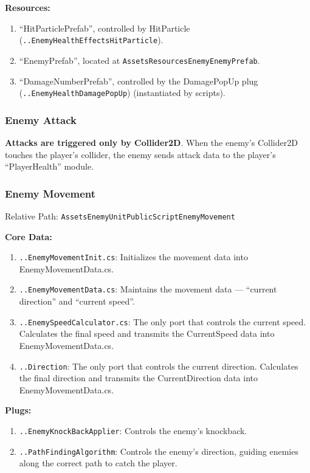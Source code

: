 \par\textbf{Resources:}
\begin{enumerate}
	\item ``HitParticlePrefab'', controlled by HitParticle (\texttt{\bs ..\bs EnemyHealth\bs Effects\bs HitParticle}).
	\item ``EnemyPrefab'', located at \texttt{\bs Assets\bs Resources\bs Enemy\bs EnemyPrefab}.
	\item ``DamageNumberPrefab'', controlled by the DamagePopUp plug (\texttt{\bs ..\bs EnemyHealth\bs DamagePopUp}) (instantiated by scripts).
\end{enumerate}

\subsubsection{Enemy Attack}

\par \hspace{1.5em}\textbf{Attacks are triggered only by Collider2D}. When the enemy's Collider2D touches the player's collider, the enemy sends attack data to the player's ``PlayerHealth'' module.

\subsubsection{Enemy Movement}

\par \hspace{1.5em} Relative Path: \texttt{\bs Assets\bs EnemyUnit\bs PublicScript\bs EnemyMovement}

\par \textbf{Core Data:}

\begin{enumerate}
	\item\texttt{\bs ..\bs EnemyMovementInit.cs}: Initializes the movement data into EnemyMovementData.cs.
	\item\texttt{\bs ..\bs EnemyMovementData.cs}: Maintains the movement data — ``current direction'' and ``current speed''.
	\item\texttt{\bs ..\bs EnemySpeedCalculator.cs}: The only port that controls the current speed. Calculates the final speed and transmits the CurrentSpeed data into EnemyMovementData.cs.
	\item\texttt{\bs ..\bs Direction}: The only port that controls the current direction. Calculates the final direction and transmits the CurrentDirection data into EnemyMovementData.cs.
\end{enumerate}

\par \textbf{Plugs:}
\begin{enumerate}
	\item\texttt{\bs ..\bs EnemyKnockBackApplier}: Controls the enemy's knockback.
	\item\texttt{\bs ..\bs PathFindingAlgorithm}: Controls the enemy's direction, guiding enemies along the correct path to catch the player.
\end{enumerate}
